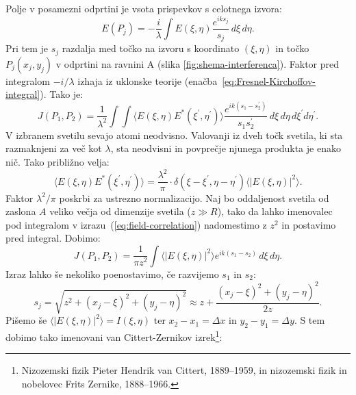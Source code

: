 Polje v posamezni odprtini je vsota prispevkov s celotnega izvora:
\begin{equation}
E(P_{j})=-\frac{i}{\lambda}\int E(\xi,\eta)\frac{e^{iks_{j}}}{s_{j}}\, d\xi\, d\eta.
\end{equation}
Pri tem je $s_{j}$ razdalja med točko na izvoru s koordinato $(\xi,\eta)$  in točko
$P_{j}(x_{j},y_{j})$ v odprtini na ravnini A (slika \ref{fig:shema-interferenca}).
Faktor pred integralom $-i/\lambda$ izhaja iz uklonske teorije (enačba~\ref{eq:Fresnel-Kirchoffov-integral}).
Tako je:
\begin{equation}
J(P_{1},P_{2})=\frac{1}{\lambda^{2}}\int\int\langle E(\xi,\eta)E^{*}(\xi^{\prime},\eta^{\prime})\rangle\frac{e^{ik(s_{1}-s_{2}^{\prime})}}{s_{1}s_{2}^{\prime}}\, d\xi\, d\eta\, d\xi^{\prime}d\eta^{\prime}.\label{eq:field-correlation}
\end{equation}
V izbranem svetilu sevajo atomi neodvisno. Valovanji iz dveh točk svetila,
ki sta razmaknjeni za več kot $\lambda$, sta neodvisni in povprečje
njunega produkta je enako nič. Tako približno velja:
\begin{equation}
\langle E(\xi,\eta)E^{*}(\xi^{\prime},\eta^{\prime})\rangle=\frac{\lambda^{2}}{\pi} \cdot \delta(\xi-\xi^{\prime},\eta-\eta^{\prime})\langle|E(\xi,\eta)|^{2}\rangle.
\label{eq:delta-Zernike}
\end{equation}
Faktor $\lambda^{2}/\pi$ poskrbi za ustrezno normalizacijo. Naj bo oddaljenost svetila od zaslona $A$
veliko večja od dimenzije svetila ($z\gg R$), tako da lahko imenovalec pod integralom
v izrazu~(\ref{eq:field-correlation}) nadomestimo z $z^{2}$ in postavimo
pred integral. Dobimo:
\begin{equation}
J(P_{1},P_{2})=\frac{1}{\pi z^{2}}\int\langle|E(\xi,\eta)|^{2}\rangle e^{ik(s_{1}-s_{2})}\, d\xi\, d\eta.\label{eq:Zernike1}
\end{equation}
Izraz lahko še nekoliko poenostavimo, če razvijemo $s_{1}$
in $s_{2}$: 
\begin{equation}
s_{j}=\sqrt{z^{2}+(x_{j}-\xi)^{2}+(y_{j}-\eta)^{2}}\approx z+\frac{(x_{j}-\xi)^{2}+(y_{j}-\eta)^{2}}{2z}.
\end{equation}
Pišemo še $\langle|E(\xi,\eta)|^{2}\rangle=I(\xi,\eta)$ ter $x_{2}-x_{1}=\Delta x$
in $y_{2}-y_{1}=\Delta y$. S tem dobimo tako imenovani 
van Cittert-Zernikov izrek\footnote{Nizozemski fizik Pieter Hendrik van Cittert, 1889--1959, in 
nizozemski fizik in nobelovec Frits Zernike, 1888--1966.}:


